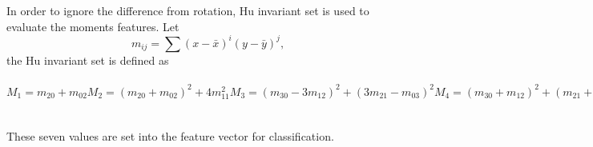 \documentclass[paper=a4, fontsize=11pt]{scrartcl}
\begin{document}
\begin{itemize}
In order to ignore the difference from rotation, Hu invariant set is used to evaluate the moments features.
Let
\begin{equation}
m_{ij} = \sum ( x - \bar{x} )^{i} ( y - \bar{y} )^{j},
\end{equation}
the Hu invariant set is defined as 
\begin{subequations}
\begin{equation}
M_{1} = m_{20} + m_{02}
\end{equation}
\begin{equation}
M_{2} = (m_{20} + m_{02})^{2} + 4 m_{11}^{2}
\end{equation}
\begin{equation}
M_{3} = (m_{30} - 3m_{12})^{2} + (3m_{21}-m_{03})^{2}
\end{equation}
\begin{equation}
M_{4} = (m_{30} + m_{12})^{2} + (m_{21} + m_{03})^{2}
\end{equation}
\begin{equation}
\begin{aligned}
M_{5} = & (m_{30} - 3m_{12})( m_{30}+ m_{12} ) [ (m_{30} + m_{12})^{2} - 3(m_{21} + m_{03})^{2} ] \\
 & + (3 m_{21}- m_{03})(m_{21} + m_{03})[ 3(m_{30} + m_{12})^{2}-(m_{21} + m_{03})^{2} ]
 \end{aligned}
\end{equation}
\begin{equation}
\begin{aligned}
M_{6} = & (m_{20}+m_{02}) [ (m_{30} + m_[12])^{2} - 3 (m_{21} + m_{03})^{2} ] \\
 & + 4 m_{11} (m_{30} + m_{12}) ( m_{03} + m_{21} )
\end{aligned} 
\end{equation}
\begin{equation}
\begin{aligned}
M_{7} = & (3 m_{21} - m_{03}) ( m_{12} + m_{30}) [ m_{30} + m_{12}^{2} - 3(m_{21} + m_{03} )^{2} ] \\ 
& - (m_{30} - 3 m_{12}) (m_{12} + m_{03}) [ 3 ( m_{30} + m_{12} )^{2} - (m_{21} + m_{03})^{2} ]
\end{aligned}
\end{equation}
\end{subequations}

These seven values are set into the feature vector for classification.

\end{itemize}
\end{document}
